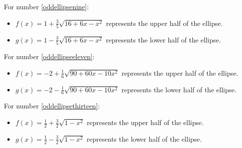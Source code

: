 \begin{enumerate}
For number \ref{oddellipsenine}:

\begin{itemize}

\item  $f(x) = 1 + \frac{3}{5} \sqrt{16+6x-x^2}$ represents the upper half of the ellipse.

\item  $g(x) =  1 - \frac{3}{5} \sqrt{16+6x-x^2} $   represents the lower half of the ellipse.

\end{itemize}


For number \ref{oddellipseeleven}:

\begin{itemize}

\item  $f(x) = -2 + \frac{1}{6} \sqrt{90+60x-10x^2}$ represents the upper half of the ellipse.

\item  $g(x) =  -2 -  \frac{1}{6} \sqrt{90+60x-10x^2}  $   represents the lower half of the ellipse.

\end{itemize}

\newpage


For number \ref{oddellipsethirteen}:

\begin{itemize}

\item  $f(x) = \frac{1}{2} + \frac{3}{2} \sqrt{1-x^2} $ represents the upper half of the ellipse.

\item  $g(x) =  \frac{1}{2} - \frac{3}{2} \sqrt{1-x^2} $   represents the lower half of the ellipse.

\end{itemize}


\setcounter{HW}{\value{enumi}}
\end{enumerate}

